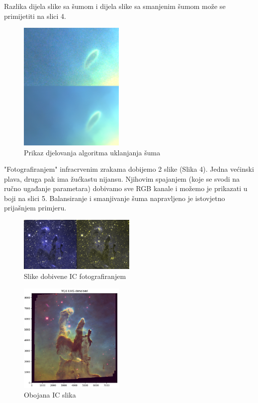 \documentclass[conference]{IEEEtran}
\begin{document}
Razlika dijela slike sa šumom i dijela slike sa smanjenim šumom može se primijetiti na slici 4.
\begin{figure}[h]
    \centering
    \includegraphics[width=0.45\textwidth]{noise_denoised}
    \caption{Prikaz djelovanja algoritma uklanjanja šuma}
    \label{slika:s4}
\end{figure}


"Fotografiranjem" infracrvenim zrakama dobijemo 2 slike (Slika 4). Jedna većinski plava, druga pak ima žućkastu nijansu. Njihovim spajanjem (koje se svodi na ručno ugađanje parametara) dobivamo sve RGB kanale i možemo je prikazati u boji na slici 5. Balansiranje i smanjivanje šuma napravljeno je istovjetno prijašnjem primjeru.
\begin{figure}[h]
    \centering
    \includegraphics[width=0.5\textwidth]{IC_kanali}
    \caption{Slike dobivene IC fotografiranjem}
    \label{slika:s5}
\end{figure}
\begin{figure}[h]
    \centering
    \includegraphics[width=0.45\textwidth]{IC_colorized}
    \caption{Obojana IC slika}
    \label{slika:s5}
\end{figure}
\end{document}
